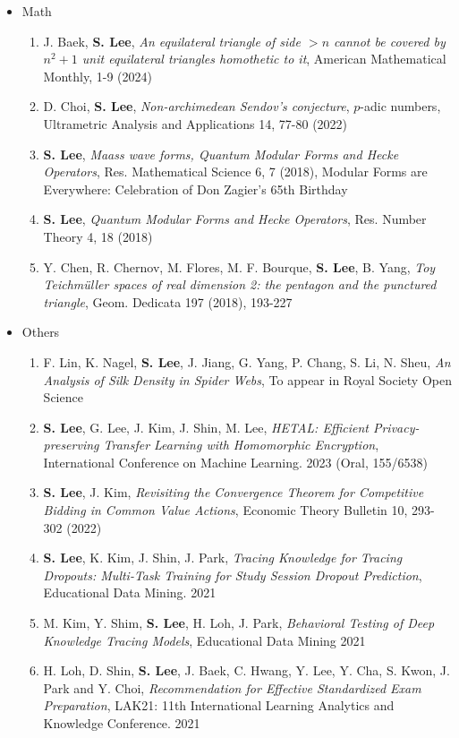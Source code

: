 \documentclass[letterpaper,11pt]{article}
\newlength{\outerbordwidth}
\newcommand{\resheading}[1]{\vspace{8pt}
  \parbox{\textwidth}{\setlength{\FrameSep}{\outerbordwidth}
    \begin{shaded}
\setlength{\fboxsep}{0pt}\framebox[\textwidth][l]{\setlength{\fboxsep}{4pt}\fcolorbox{shadecolorB}{shadecolorB}{\textbf{\sffamily{\mbox{~}\makebox[6.762in][l]{\large #1} \vphantom{p\^{E}}}}}}
    \end{shaded}
  }\vspace{-5pt}
}
\begin{document}
\resheading{Publications}
\begin{itemize}
	\item Math
	\begin{enumerate}
		\item J. Baek, \textbf{S. Lee}, \emph{An equilateral triangle of side $>n$ cannot be covered by $n^2 + 1$ unit equilateral triangles homothetic to it}, American Mathematical Monthly, 1-9 (2024)
		\item D. Choi, \textbf{S. Lee}, \emph{Non-archimedean Sendov's conjecture}, 
		$p$-adic numbers, Ultrametric Analysis and Applications 14, 77-80 (2022)
		\item \textbf{S. Lee}, \emph{Maass wave forms, Quantum Modular Forms and Hecke Operators}, Res. Mathematical Science 6, 7 (2018), Modular Forms are Everywhere: Celebration of Don Zagier's 65th Birthday
		\item \textbf{S. Lee}, \emph{Quantum Modular Forms and Hecke Operators}, Res. Number Theory 4, 18 (2018)
		\item Y. Chen, R. Chernov, M. Flores, M. F. Bourque, \textbf{S. Lee}, B. Yang, \emph{Toy Teichm\"uller spaces of real dimension 2: the pentagon and the punctured triangle}, Geom. Dedicata 197 (2018), 193-227
	\end{enumerate}
	\item Others
	\begin{enumerate}
		\item F. Lin, K. Nagel, \textbf{S. Lee}, J. Jiang, G. Yang, P. Chang, S. Li, N. Sheu, \emph{An Analysis of Silk Density in Spider Webs}, To appear in Royal Society Open Science
		\item \textbf{S. Lee}, G. Lee, J. Kim, J. Shin, M. Lee, \emph{HETAL: Efficient Privacy-preserving Transfer Learning with Homomorphic Encryption}, International Conference on Machine Learning. 2023 (Oral, 155/6538)
		\item \textbf{S. Lee}, J. Kim, \emph{Revisiting the Convergence Theorem for Competitive Bidding in Common Value Actions}, Economic Theory Bulletin 10, 293-302 (2022)
		\item \textbf{S. Lee}, K. Kim, J. Shin, J. Park, \emph{Tracing Knowledge for Tracing Dropouts: Multi-Task Training for Study Session Dropout Prediction}, Educational Data Mining. 2021
		\item M. Kim, Y. Shim, \textbf{S. Lee}, H. Loh, J. Park, \emph{Behavioral Testing of Deep Knowledge Tracing Models}, Educational Data Mining 2021
		\item H. Loh, D. Shin, \textbf{S. Lee}, J. Baek, C. Hwang, Y. Lee, Y. Cha, S. Kwon, J. Park and Y. Choi, \emph{Recommendation for Effective Standardized Exam Preparation}, LAK21: 11th International Learning Analytics and Knowledge Conference. 2021

\end{enumerate}
\end{itemize}
\end{document}
